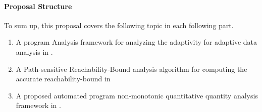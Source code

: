 \paragraph*{Proposal Structure}
To sum up, this proposal covers the following topic in each following part.
\begin{enumerate}
    \item A program Analysis framework for analyzing the adaptivity for adaptive data analysis in .
    \item A Path-sensitive Reachability-Bound analysis algorithm for computing the accurate reachability-bound in 
\item A proposed automated program non-monotonic quantitative quantity analysis framework in .
\end{enumerate}